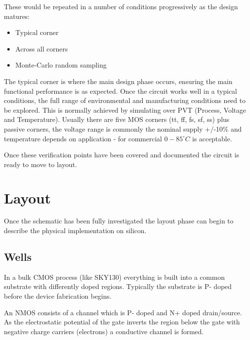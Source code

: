 \documentclass[11pt]{article}
\begin{document}
These would be repeated in a number of conditions progressively as the design matures:

\begin{itemize}
  \item Typical corner
  \item Across all corners
  \item Monte-Carlo random sampling
\end{itemize}

The typical corner is where the main design phase occurs, ensuring the main functional performance is as expected. Once the circuit works well in a typical conditions, the full range of environmental and manufacturing conditions need to be explored. This is normally achieved by simulating over PVT (Process, Voltage and Temperature). Usually there are five MOS corners (tt, ff, fs, sf, ss) plus passive corners, the voltage range is commonly the nominal supply +/-10\% and temperature depends on application - for commercial $0 - 85^\circ C$ is acceptable.

Once these verification points have been covered and documented the circuit is ready to move to layout.

\newpage
\section{Layout}

Once the schematic has been fully investigated the layout phase can begin to describe the physical implementation on silicon.

\subsection{Wells}

In a bulk CMOS process (like SKY130) everything is built into a common substrate with differently doped regions. Typically the substrate is P- doped before the device fabrication begins.

An NMOS consists of a channel which is P- doped and N+ doped drain/source. As the electrostatic potential of the gate inverts the region below the gate with negative charge carriers (electrons) a conductive channel is formed.

\begin{figure}[h]
\end{figure}
\end{document}
